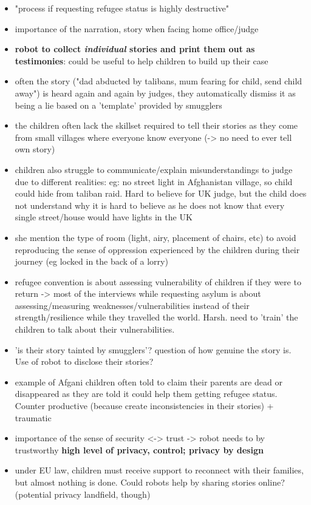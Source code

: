 \documentclass[11pt]{article}
\begin{document}
\begin{itemize}
    \item "process if requesting refugee status is highly destructive"
    \item importance of the narration, story when facing home office/judge
    \item \textbf{robot to collect \emph{individual} stories and print them out as
        testimonies}: could be useful to help children to build up their case
    \item often the story ("dad abducted by talibans, mum fearing for child,
        send child away") is heard again and again by judges, they automatically
        dismiss it as being a lie based on a 'template' provided by smugglers
    \item the children often lack the skillset required to tell their stories as
        they come from small villages where everyone know everyone (-> no need
        to ever tell own story)
    \item children also struggle to communicate/explain misunderstandings to
        judge due to different realities: eg: no street light in Afghanistan
        village, so child could hide from taliban raid. Hard to believe for UK
        judge, but the child does not understand why it is hard to believe as he
        does not know that every single street/house would have lights in the UK
    \item she mention the type of room (light, airy, placement of chairs, etc)
        to avoid reproducing the sense of oppression experienced by the children
        during their journey (eg locked in the back of a lorry)
    \item refugee convention is about assessing vulnerability of children if
        they were to return -> most of the interviews while requesting asylum is
        about assessing/measuring weaknesses/vulnerabilities instead of their
        strength/resilience while they travelled the world. Harsh. need to
        'train' the children to talk about their vulnerabilities.
    \item 'is their story tainted by smugglers'? question of how genuine the
        story is. Use of robot to disclose their stories?
    \item example of Afgani children often told to claim their parents are dead
        or disappeared as they are told it could help them getting refugee
        status. Counter productive (because create inconsistencies in their
        stories) + traumatic
    \item importance of the sense of security <-> trust -> robot needs to by
        trustworthy \textbf{high level of privacy, control; privacy by design}
    \item under EU law, children must receive support to reconnect with their
        families, but almost nothing is done. Could robots help by sharing
        stories online? (potential privacy landfield, though)
\end{itemize}
\end{document}
